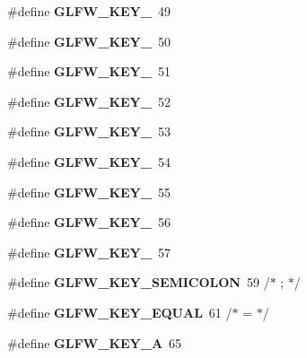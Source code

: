 \begin{DoxyCompactItemize}
\#define {\bfseries G\+L\+F\+W\+\_\+\+K\+E\+Y\+\_}~49
\item 
\mbox{\label{group__keys_gadc8e66b3a4c4b5c39ad1305cf852863c}} 
\#define {\bfseries G\+L\+F\+W\+\_\+\+K\+E\+Y\+\_}~50
\item 
\mbox{\label{group__keys_ga812f0273fe1a981e1fa002ae73e92271}} 
\#define {\bfseries G\+L\+F\+W\+\_\+\+K\+E\+Y\+\_}~51
\item 
\mbox{\label{group__keys_ga9e14b6975a9cc8f66cdd5cb3d3861356}} 
\#define {\bfseries G\+L\+F\+W\+\_\+\+K\+E\+Y\+\_}~52
\item 
\mbox{\label{group__keys_ga4d74ddaa5d4c609993b4d4a15736c924}} 
\#define {\bfseries G\+L\+F\+W\+\_\+\+K\+E\+Y\+\_}~53
\item 
\mbox{\label{group__keys_ga9ea4ab80c313a227b14d0a7c6f810b5d}} 
\#define {\bfseries G\+L\+F\+W\+\_\+\+K\+E\+Y\+\_}~54
\item 
\mbox{\label{group__keys_gab79b1cfae7bd630cfc4604c1f263c666}} 
\#define {\bfseries G\+L\+F\+W\+\_\+\+K\+E\+Y\+\_}~55
\item 
\mbox{\label{group__keys_gadeaa109a0f9f5afc94fe4a108e686f6f}} 
\#define {\bfseries G\+L\+F\+W\+\_\+\+K\+E\+Y\+\_}~56
\item 
\mbox{\label{group__keys_ga2924cb5349ebbf97c8987f3521c44f39}} 
\#define {\bfseries G\+L\+F\+W\+\_\+\+K\+E\+Y\+\_}~57
\item 
\mbox{\label{group__keys_ga84233de9ee5bb3e8788a5aa07d80af7d}} 
\#define {\bfseries G\+L\+F\+W\+\_\+\+K\+E\+Y\+\_\+\+S\+E\+M\+I\+C\+O\+L\+ON}~59  /$\ast$ ; $\ast$/
\item 
\mbox{\label{group__keys_gae1a2de47240d6664423c204bdd91bd17}} 
\#define {\bfseries G\+L\+F\+W\+\_\+\+K\+E\+Y\+\_\+\+E\+Q\+U\+AL}~61  /$\ast$ = $\ast$/
\item 
\mbox{\label{group__keys_ga03e842608e1ea323370889d33b8f70ff}} 
\#define {\bfseries G\+L\+F\+W\+\_\+\+K\+E\+Y\+\_\+A}~65

\end{DoxyCompactItemize}
